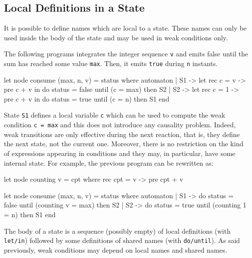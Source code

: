 \documentclass[11pt,titlepage,twoside]{report}
\begin{document}
\subsection{Local Definitions in a State\label{statelocaldefs}} %

It is possible to define names which are local to a state. These names
can only be used inside the body of the state and may be used in weak
conditions only.

The following programs integrates the integer sequence \verb-v- and
emits false until the sum has reached some value \verb-max-. Then, it
emits \verb-true- during \verb-n- instants.
\begin{chklisting}
let node consume (max, n, v) = status where
  automaton
  | S1 ->
      let rec c = v -> pre c + v in
      do status = false
      until (c = max) then S2
  | S2 ->
      let rec c = 1 -> pre c + v in
      do status = true
      until (c = n) then S1
  end
\end{chklisting}

State \verb-S1- defines a local variable \verb-c- which can be used to
compute the weak condition \verb-c = max- and this does not introduce
any causality problem. Indeed, weak transitions are only effective
during the next reaction, that is, they define the next state, not the
current one. Moreover, there is no restriction on the kind of
expressions appearing in conditions and they may, in particular, have
some internal state. For example, the previous program can be
rewritten as:
\begin{chklisting}
let node counting v = cpt where
  rec cpt = v -> pre cpt + v

let node consume (max, n, v) = status where
  automaton
  | S1 ->
       do status = false
       until (counting v = max) then S2
  | S2 ->
       do status = true
       until (counting 1 = n) then S1
  end
\end{chklisting}
The body of a state is a sequence (possibly empty) of local
definitions (with \verb-let/in-) followed by some definitions of
shared names (with \verb-do/until-). As said previously, weak
conditions may depend on local names and shared names.
\end{document}
